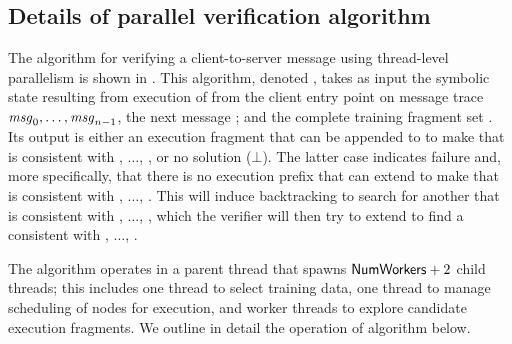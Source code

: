 \subsection{Details of parallel verification algorithm} 
\label{sec:par:verifydetails}

The algorithm for verifying a client-to-server message using
thread-level parallelism is shown in . This
algorithm, denoted \parallelVerifyAlg, takes as input the symbolic
state  resulting from execution of
 from the client entry point on message trace
$\mathit{msg}_{0},\ldots,\mathit{msg}_{n-1}$, the next message \msg{\msgNmbr};
and the complete training fragment set \trainingFrags{}.  Its output
is either an execution fragment that can be appended to
 to make \execPrefix{\msgNmbr} that is
consistent with , $\ldots$, \msg{\msgNmbr}, or no solution 
($\bot$).  The latter case indicates failure and, more specifically,
that there is no execution prefix that can extend
 to make \execPrefix{\msgNmbr} that is
consistent with , $\ldots$, .  This will induce
backtracking to search for another  that
is consistent with , $\ldots$, , which the
verifier will then try to extend to find a \execPrefix{\msgNmbr}
consistent with , $\ldots$, \msg{\msgNmbr}. 

The algorithm operates in a parent thread that spawns $\mathsf{NumWorkers}+2$
child threads; this includes one thread to select training data, one
thread to manage scheduling of nodes for execution, and \workerCount
worker threads to explore candidate execution fragments.
We outline in detail the operation of algorithm
\parallelVerifyAlg below.

